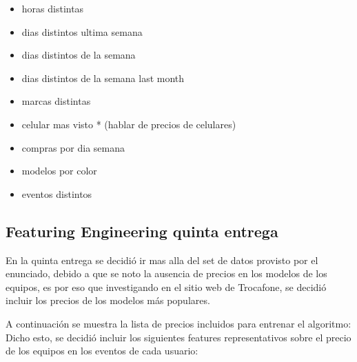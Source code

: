 \documentclass[a4paper ,12pt]{article}
\begin{document}
\begin{itemize}
	\item horas distintas

	\item dias distintos ultima semana

	\item dias distintos de la semana

	\item dias distintos de la semana last month

	\item marcas distintas

	\item celular mas visto * (hablar de precios de celulares)

	\item compras por dia semana

	\item modelos por color

	\item eventos distintos

\end{itemize}

\newpage
\subsection{Featuring Engineering quinta entrega}

En la quinta entrega se decidió ir mas alla del set de datos provisto por el enunciado, debido a que se noto la ausencia de precios en 
los modelos de los equipos, es por eso que investigando en el sitio web de Trocafone, se decidió incluir los precios de los modelos más populares.

A continuación se muestra la lista de precios incluidos para entrenar el algoritmo:
Dicho esto, se decidió incluir los siguientes features representativos sobre el precio de los equipos en los eventos de cada usuario:
\end{document}
